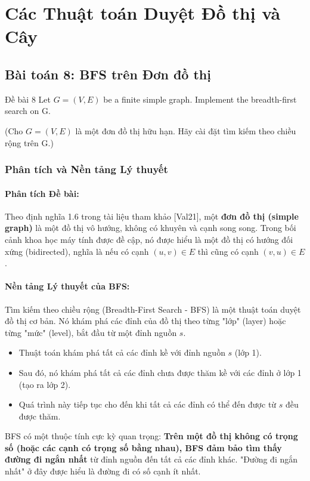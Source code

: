 \documentclass[a4paper,12pt]{article}
\begin{document}
\section{Các Thuật toán Duyệt Đồ thị và Cây}
\subsection{Bài toán 8: BFS trên Đơn đồ thị}
\begin{problembox}{Đề bài 8}
    Let $G = (V,E)$ be a finite simple graph. Implement the breadth-first search on G.
    
    (Cho $G = (V,E)$ là một đơn đồ thị hữu hạn. Hãy cài đặt tìm kiếm theo chiều rộng trên G.)
\end{problembox}

\subsubsection{Phân tích và Nền tảng Lý thuyết}
\paragraph{Phân tích Đề bài:}
Theo định nghĩa 1.6 trong tài liệu tham khảo [Val21], một \textbf{đơn đồ thị (simple graph)} là một đồ thị vô hướng, không có khuyên và cạnh song song. Trong bối cảnh khoa học máy tính được đề cập, nó được hiểu là một đồ thị có hướng đối xứng (bidirected), nghĩa là nếu có cạnh $(u, v) \in E$ thì cũng có cạnh $(v, u) \in E$.

\paragraph{Nền tảng Lý thuyết của BFS:}
Tìm kiếm theo chiều rộng (Breadth-First Search - BFS) là một thuật toán duyệt đồ thị cơ bản. Nó khám phá các đỉnh của đồ thị theo từng "lớp" (layer) hoặc từng "mức" (level), bắt đầu từ một đỉnh nguồn $s$.
\begin{itemize}
    \item Thuật toán khám phá tất cả các đỉnh kề với đỉnh nguồn $s$ (lớp 1).
    \item Sau đó, nó khám phá tất cả các đỉnh chưa được thăm kề với các đỉnh ở lớp 1 (tạo ra lớp 2).
    \item Quá trình này tiếp tục cho đến khi tất cả các đỉnh có thể đến được từ $s$ đều được thăm.
\end{itemize}
BFS có một thuộc tính cực kỳ quan trọng: \textbf{Trên một đồ thị không có trọng số (hoặc các cạnh có trọng số bằng nhau), BFS đảm bảo tìm thấy đường đi ngắn nhất} từ đỉnh nguồn đến tất cả các đỉnh khác. "Đường đi ngắn nhất" ở đây được hiểu là đường đi có số cạnh ít nhất.
\end{document}
